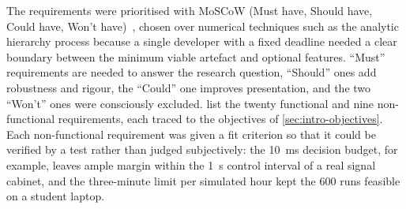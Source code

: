 The requirements were prioritised with MoSCoW (Must have, Should have, Could have, Won't have)~\cite{hudaib2018requirements}, chosen over numerical techniques such as the analytic hierarchy process because a single developer with a fixed deadline needed a clear boundary between the minimum viable artefact and optional features. ``Must'' requirements are needed to answer the research question, ``Should'' ones add robustness and rigour, the ``Could'' one improves presentation, and the two ``Won't'' ones were consciously excluded.  list the twenty functional and nine non-functional requirements, each traced to the objectives of \cref{sec:intro-objectives}. Each non-functional requirement was given a fit criterion so that it could be verified by a test rather than judged subjectively: the 10~ms decision budget, for example, leaves ample margin within the 1~s control interval of a real signal cabinet, and the three-minute limit per simulated hour kept the 600 runs feasible on a student laptop.


